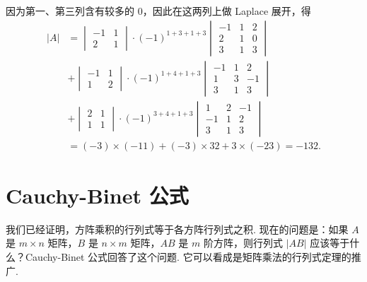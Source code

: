 \begin{solution}
    因为第一、第三列含有较多的 $0$，因此在这两列上做 Laplace 展开，得
    \begin{align*}
        |A| & = \begin{vmatrix}
                    -1 & 1 \\ 2 & 1
                \end{vmatrix} \cdot (-1)^{1+3+1+3}
        \begin{vmatrix}
            -1 & 1 & 2 \\ 2 & 1 & 0 \\ 3 & 1 & 3
        \end{vmatrix}                                 \\
            & + \begin{vmatrix}
                    -1 & 1 \\ 1 & 2
                \end{vmatrix} \cdot (-1)^{1+4+1+3}
        \begin{vmatrix}
            -1 & 1 & 2 \\ 1 & 3 & -1 \\ 3 & 1 & 3
        \end{vmatrix}                                \\
            & + \begin{vmatrix}
                    2 & 1 \\ 1 & 1
                \end{vmatrix} \cdot (-1)^{3+4+1+3}
        \begin{vmatrix}
            1 & 2 & -1 \\ -1 & 1 & 2 \\ 3 & 1 & 3
        \end{vmatrix}                                \\
            & = (-3) \times (-11) + (-3) \times 32 + 3 \times (-23) = -132.
    \end{align*}
\end{solution}

\section{Cauchy-Binet 公式}

我们已经证明，方阵乘积的行列式等于各方阵行列式之积. 现在的问题是：如果 $A$ 是 $m \times n$ 矩阵，$B$ 是 $n \times m$ 矩阵，$AB$ 是 $m$ 阶方阵，则行列式 $|AB|$ 应该等于什么？Cauchy-Binet 公式回答了这个问题. 它可以看成是矩阵乘法的行列式定理的推广.

